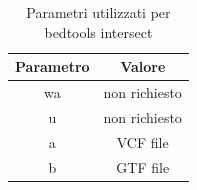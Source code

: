   \begin{table}[H]
        \centering
        \begin{tabular}{|c|c|}
                \hline
                Parametro & Valore\\
                \hline
                wa & non richiesto\\
                \hline
                u & non richiesto\\
                \hline
                a & VCF file\\
                \hline
                b & GTF file\\
                \hline
         \end{tabular}
         \caption{Parametri utilizzati per bedtools intersect}
  \end{table}

